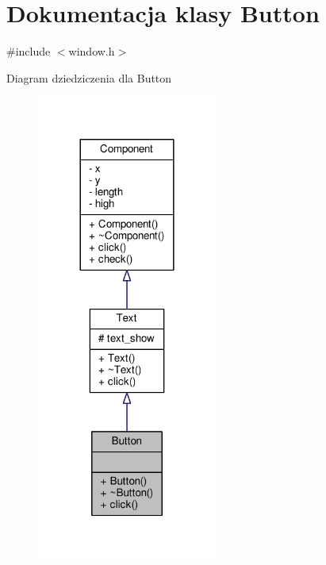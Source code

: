 \hypertarget{classButton}{}\section{Dokumentacja klasy Button}
\label{classButton}


{\ttfamily \#include $<$window.\+h$>$}



Diagram dziedziczenia dla Button
\nopagebreak
\begin{figure}[H]
\begin{center}
\leavevmode
\includegraphics[width=168pt]{classButton__inherit__graph}
\end{center}
\end{figure}


